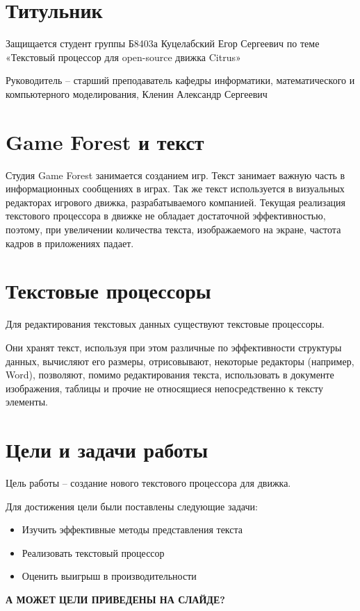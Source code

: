 \documentclass{article}
\begin{document}
    \section{Титульник}
        \par Защищается студент группы Б8403а Куцелабский Егор Сергеевич по теме «Текстовый 
        процессор для open-source движка Citrus»
        \par Руководитель – старший преподаватель кафедры информатики, математического и 
        компьютерного моделирования, Кленин Александр Сергеевич
    \section{Game Forest и текст}
        \par Студия Game Forest занимается созданием игр. Текст занимает важную часть в 
        информационных сообщениях в играх. Так же текст используется в визуальных редакторах 
        игрового движка, разрабатываемого компанией. Текущая реализация текстового процессора в 
        движке не обладает достаточной эффективностью, поэтому, при увеличении количества 
        текста, изображаемого на экране, частота кадров в приложениях падает. 
    \section{Текстовые процессоры}
        \par Для  редактирования текстовых данных существуют текстовые процессоры.
        \par Они хранят текст, используя при этом различные по эффективности структуры данных, 
        вычисляют его размеры, отрисовывают, некоторые редакторы (например, Word), позволяют, 
        помимо редактирования текста, использовать в документе изображения, таблицы и прочие не 
        относящиеся непосредственно к тексту элементы.
    \section{Цели и задачи работы}
        \par Цель работы – создание нового текстового процессора для движка.
        \par Для достижения цели были поставлены следующие задачи:
        \begin{itemize}
            \item Изучить эффективные методы представления текста
            \item Реализовать текстовый процессор
            \item Оценить выигрыш в производительности
        \end{itemize}
        \textbf{А МОЖЕТ ЦЕЛИ ПРИВЕДЕНЫ НА СЛАЙДЕ?}
\end{document}
